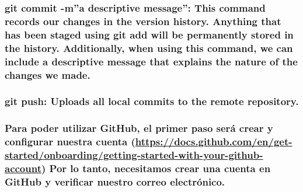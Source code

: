 \documentclass[
]{article}
\begin{document}
\subsubsection{\texorpdfstring{\textbf{git commit -m''a descriptive
message''}: This command records our changes in the version history.
Anything that has been staged using git add will be permanently stored
in the history. Additionally, when using this command, we can include a
descriptive message that explains the nature of the changes we
made.}{git commit -m''a descriptive message'': This command records our changes in the version history. Anything that has been staged using git add will be permanently stored in the history. Additionally, when using this command, we can include a descriptive message that explains the nature of the changes we made.}}\label{git-commit--ma-descriptive-message-this-command-records-our-changes-in-the-version-history.-anything-that-has-been-staged-using-git-add-will-be-permanently-stored-in-the-history.-additionally-when-using-this-command-we-can-include-a-descriptive-message-that-explains-the-nature-of-the-changes-we-made.}

\subsubsection{\texorpdfstring{\textbf{git push}: Uploads all local
commits to the remote
repository.}{git push: Uploads all local commits to the remote repository.}}\label{git-push-uploads-all-local-commits-to-the-remote-repository.}

\newpage

\subsubsection{\texorpdfstring{Para poder utilizar GitHub, el primer
paso será crear y configurar nuestra cuenta
(\url{https://docs.github.com/en/get-started/onboarding/getting-started-with-your-github-account})
Por lo tanto, necesitamos crear una cuenta en GitHub y verificar nuestro
correo
electrónico.}{Para poder utilizar GitHub, el primer paso será crear y configurar nuestra cuenta (https://docs.github.com/en/get-started/onboarding/getting-started-with-your-github-account) Por lo tanto, necesitamos crear una cuenta en GitHub y verificar nuestro correo electrónico.}}\label{para-poder-utilizar-github-el-primer-paso-seruxe1-crear-y-configurar-nuestra-cuenta-httpsdocs.github.comenget-startedonboardinggetting-started-with-your-github-account-por-lo-tanto-necesitamos-crear-una-cuenta-en-github-y-verificar-nuestro-correo-electruxf3nico.}
\end{document}
